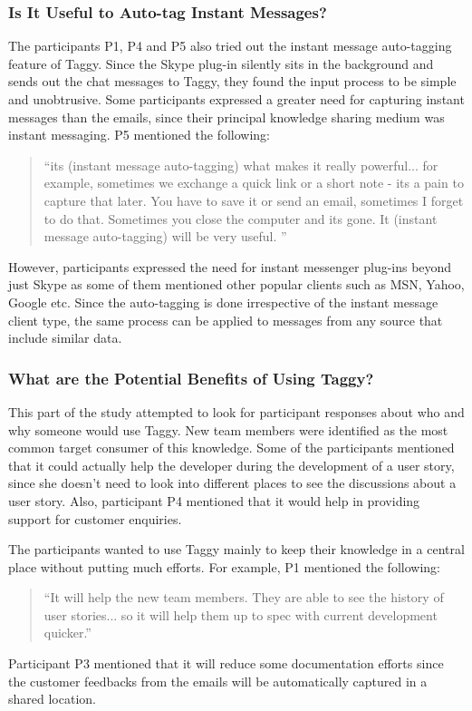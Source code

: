\subsubsection{Is It Useful to Auto-tag Instant Messages?}
The participants P1, P4 and P5 also tried out the instant message auto-tagging feature of Taggy. Since the Skype plug-in silently sits in the background and sends out the chat messages to Taggy, they found the input process to be simple and unobtrusive. Some participants expressed a greater need for capturing instant messages than the emails, since their principal knowledge sharing medium was instant messaging. P5 mentioned the following:

\begin{quote}
	``its (instant message auto-tagging) what makes it really powerful... for example, sometimes we exchange a quick link or a short note - its a pain to capture that later. You have to save it or send an email, sometimes I forget to do that. Sometimes you close the computer and its gone. It (instant message auto-tagging) will be very useful. ''
\end{quote}

However, participants expressed the need for instant messenger plug-ins beyond just Skype as some of them mentioned other popular clients such as MSN, Yahoo, Google etc. Since the auto-tagging is done irrespective of the instant message client type, the same process can be applied to messages from any source that include similar data.

\subsubsection{What are the Potential Benefits of Using Taggy?}
This part of the study attempted to look for participant responses about who and why someone would use Taggy. New team members were identified as the most common target consumer of this knowledge. Some of the participants mentioned that it could actually help the developer during the development of a user story, since she doesn't need to look into different places to see the discussions about a user story. Also, participant P4 mentioned that it would help in providing support for customer enquiries.

The participants wanted to use Taggy mainly to keep their knowledge in a central place without putting much efforts. For example, P1 mentioned the following:
\begin{quote}
	``It will help the new team members. They are able to see the history of user stories... so it will help them up to spec with current development quicker.''
\end{quote}
Participant P3 mentioned that it will reduce some documentation efforts since the customer feedbacks from the emails will be automatically captured in a shared location.

